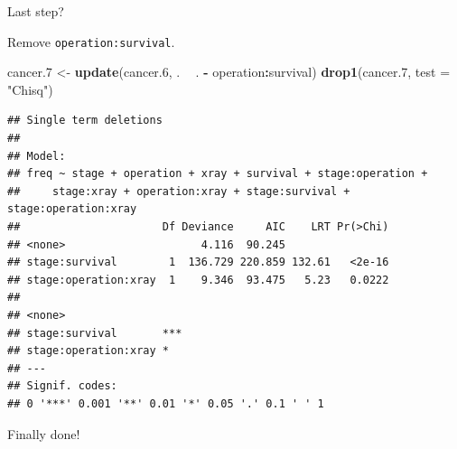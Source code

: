 \documentclass[ignorenonframetext,]{beamer}
\newenvironment{Shaded}{\begin{snugshade}}{\end{snugshade}}
\newcommand{\DataTypeTok}[1]{\textcolor[rgb]{0.13,0.29,0.53}{#1}}
\newcommand{\FloatTok}[1]{\textcolor[rgb]{0.00,0.00,0.81}{#1}}
\newcommand{\KeywordTok}[1]{\textcolor[rgb]{0.13,0.29,0.53}{\textbf{#1}}}
\newcommand{\NormalTok}[1]{#1}
\newcommand{\OperatorTok}[1]{\textcolor[rgb]{0.81,0.36,0.00}{\textbf{#1}}}
\newcommand{\StringTok}[1]{\textcolor[rgb]{0.31,0.60,0.02}{#1}}
\begin{document}
\begin{frame}[fragile]{Last step?}
\protect\hypertarget{last-step}{}

Remove \texttt{operation:survival}.

\begin{Shaded}
\begin{Highlighting}[]
\NormalTok{cancer}\FloatTok{.7}\NormalTok{ <-}\StringTok{ }\KeywordTok{update}\NormalTok{(cancer}\FloatTok{.6}\NormalTok{, . }\OperatorTok{~}\StringTok{ }\NormalTok{. }\OperatorTok{-}\StringTok{ }\NormalTok{operation}\OperatorTok{:}\NormalTok{survival)}
\KeywordTok{drop1}\NormalTok{(cancer}\FloatTok{.7}\NormalTok{, }\DataTypeTok{test =} \StringTok{"Chisq"}\NormalTok{)}
\end{Highlighting}
\end{Shaded}

\begin{verbatim}
## Single term deletions
## 
## Model:
## freq ~ stage + operation + xray + survival + stage:operation + 
##     stage:xray + operation:xray + stage:survival + stage:operation:xray
##                      Df Deviance     AIC    LRT Pr(>Chi)
## <none>                     4.116  90.245                
## stage:survival        1  136.729 220.859 132.61   <2e-16
## stage:operation:xray  1    9.346  93.475   5.23   0.0222
##                         
## <none>                  
## stage:survival       ***
## stage:operation:xray *  
## ---
## Signif. codes:  
## 0 '***' 0.001 '**' 0.01 '*' 0.05 '.' 0.1 ' ' 1
\end{verbatim}

Finally done!

\end{frame}
\end{document}
